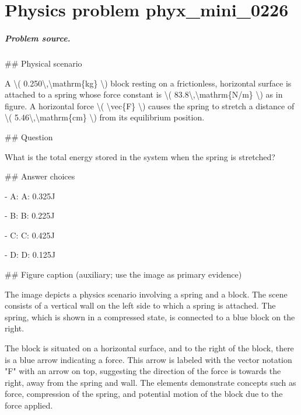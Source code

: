 
\chapter{Physics problem phyx\_mini\_0226}
\label{ch:PhyXMiniProblems_problem_phyx_mini_0226}

\paragraph{Problem source.}
\#\# Physical scenario

A \textbackslash{}( 0.250\textbackslash{},\textbackslash{}mathrm\{kg\} \textbackslash{}) block resting on a frictionless, horizontal surface is attached to a spring whose force constant is \textbackslash{}( 83.8\textbackslash{},\textbackslash{}mathrm\{N/m\} \textbackslash{}) as in figure. A horizontal force \textbackslash{}( \textbackslash{}vec\{F\} \textbackslash{}) causes the spring to stretch a distance of \textbackslash{}( 5.46\textbackslash{},\textbackslash{}mathrm\{cm\} \textbackslash{}) from its equilibrium position.

\#\# Question

What is the total energy stored in the system when the spring is stretched?

\#\# Answer choices

- A: A: 0.325J

- B: B: 0.225J

- C: C: 0.425J

- D: D: 0.125J

\#\# Figure caption (auxiliary; use the image as primary evidence)

The image depicts a physics scenario involving a spring and a block. The scene consists of a vertical wall on the left side to which a spring is attached. The spring, which is shown in a compressed state, is connected to a blue block on the right. 

The block is situated on a horizontal surface, and to the right of the block, there is a blue arrow indicating a force. This arrow is labeled with the vector notation "F" with an arrow on top, suggesting the direction of the force is towards the right, away from the spring and wall. The elements demonstrate concepts such as force, compression of the spring, and potential motion of the block due to the force applied.

